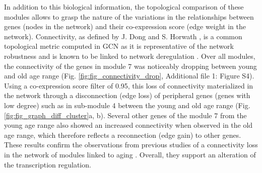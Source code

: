 In addition to this biological information, the topological comparison of these modules allows to grasp the nature of the variations in the relationships between genes (nodes in the network) and their co-expression score (edge weight in the network). Connectivity, as defined by J. Dong and S. Horwath , is a common topological metric computed in GCN as it is representative of the network robustness and is known to be linked to network deregulation . Over all modules, the connectivity of the genes in module 7 was noticeably dropping between young and old age range (Fig. \ref{fig:fig_connectivity_drop}, Additional file 1: Figure S4). 
Using a co-expression score filter of 0.95, this loss of connectivity materialized in the network through a disconnection (edge loss) of peripheral genes (genes with low degree) such as in sub-module 4 between the young and old age range (Fig. \ref{fig:fig_graph_diff_cluster}a, b). Several other genes of the module 7 from the young age range also showed an increased connectivity when observed in the old age range, which therefore reflects a reconnection (edge gain) to other genes. These results confirm the observations from previous studies of a connectivity loss in the network of modules linked to aging . Overall, they support an alteration of the transcription regulation.

